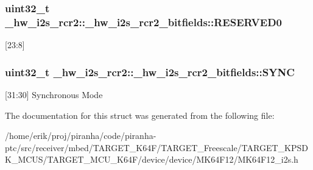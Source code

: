 \subsubsection[{\texorpdfstring{R\+E\+S\+E\+R\+V\+E\+D0}{RESERVED0}}]{\setlength{\rightskip}{0pt plus 5cm}uint32\+\_\+t \+\_\+hw\+\_\+i2s\+\_\+rcr2\+::\+\_\+hw\+\_\+i2s\+\_\+rcr2\+\_\+bitfields\+::\+R\+E\+S\+E\+R\+V\+E\+D0}\hypertarget{struct__hw__i2s__rcr2_1_1__hw__i2s__rcr2__bitfields_a41dd71f2ffe8d1e51e3cc1148c4b3b98}{}\label{struct__hw__i2s__rcr2_1_1__hw__i2s__rcr2__bitfields_a41dd71f2ffe8d1e51e3cc1148c4b3b98}
\mbox{[}23\+:8\mbox{]} 
\subsubsection[{\texorpdfstring{S\+Y\+NC}{SYNC}}]{\setlength{\rightskip}{0pt plus 5cm}uint32\+\_\+t \+\_\+hw\+\_\+i2s\+\_\+rcr2\+::\+\_\+hw\+\_\+i2s\+\_\+rcr2\+\_\+bitfields\+::\+S\+Y\+NC}\hypertarget{struct__hw__i2s__rcr2_1_1__hw__i2s__rcr2__bitfields_ad7e36a1060950db0f0914b755115879d}{}\label{struct__hw__i2s__rcr2_1_1__hw__i2s__rcr2__bitfields_ad7e36a1060950db0f0914b755115879d}
\mbox{[}31\+:30\mbox{]} Synchronous Mode 

The documentation for this struct was generated from the following file\+:\begin{DoxyCompactItemize}
\item 
/home/erik/proj/piranha/code/piranha-\/ptc/src/receiver/mbed/\+T\+A\+R\+G\+E\+T\+\_\+\+K64\+F/\+T\+A\+R\+G\+E\+T\+\_\+\+Freescale/\+T\+A\+R\+G\+E\+T\+\_\+\+K\+P\+S\+D\+K\+\_\+\+M\+C\+U\+S/\+T\+A\+R\+G\+E\+T\+\_\+\+M\+C\+U\+\_\+\+K64\+F/device/device/\+M\+K64\+F12/M\+K64\+F12\+\_\+i2s.\+h\end{DoxyCompactItemize}
